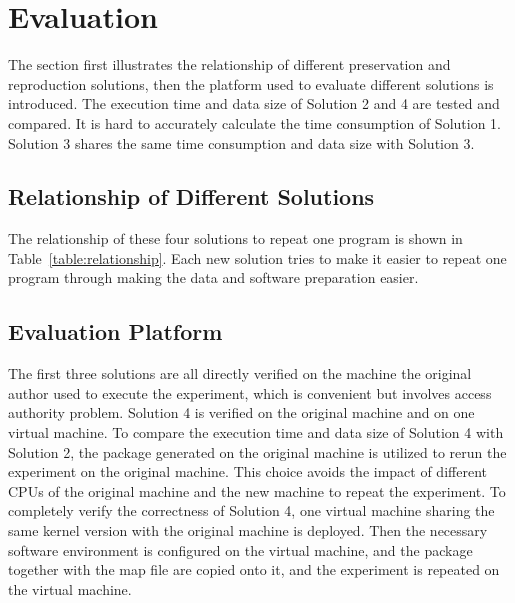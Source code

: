 \documentclass{acm_proc_article-sp}
\begin{document}

\section{Evaluation}
The section first illustrates the relationship of different preservation and reproduction solutions, then the platform used to evaluate different solutions is introduced. The execution time and data size of Solution 2 and 4 are tested and compared. It is hard to accurately calculate the time consumption of Solution 1. Solution 3 shares the same time consumption and data size with Solution 3.

\subsection{Relationship of Different Solutions}
The relationship of these four solutions to repeat one program is shown in Table~\ref{table:relationship}. Each new solution tries to make it easier to repeat one program through making the data and software preparation easier.

\subsection{Evaluation Platform}

The first three solutions are all directly verified on the machine the original
author used to execute the experiment, which is convenient but involves access
authority problem. Solution 4 is verified on the original machine and on one virtual machine.
To compare the execution time and data size of Solution 4
with Solution 2, the package generated on the original machine is utilized to
rerun the experiment on the original machine. This choice avoids the impact of
different CPUs of the original machine and the new machine to repeat the
experiment. To completely verify the correctness of Solution 4, one virtual
machine sharing the same kernel version with the original machine is deployed.
Then the necessary software environment is configured on the virtual machine,
and the package together with the map file are copied onto it, and the
experiment is repeated on the virtual machine.
\end{document}
